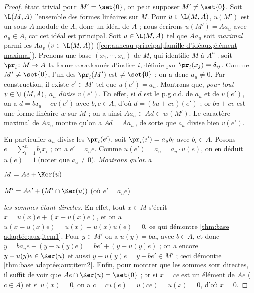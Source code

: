 \documentclass[11pt, %
  title in boldface,
  theorem in new line,
  theorem numbering = section,
  number theorems separately,
  simple name,
]{beaulivre}
\begin{document}
    \begin{proof}
         étant trivial pour \( M' = \set{0} \), on peut supposer \( M' \neq \set{0} \). Soit \( \L(M,A) \) l'ensemble des formes linéaires sur \( M \). Pour \( u \in \L(M,A) \), \( u(M') \) est un sous-\( A \)‑module de \( A \), donc un idéal de \( A \) ; nous écrirons \( u(M') = A a_u \) avec \( a_u \in A \), car cet idéal est principal. Soit \( u \in \L(M,A) \) tel que \( A a_u \) soit \emph{maximal} parmi les \( A a_v \) (\( v \in \L(M,A) \)) (\cref{cor:anneau principal;famille d'idéaux;élément maximal}). Prenons une base \( (x_1, \cdots, x_n) \) de \( M \), qui identifie \( M \) à \( A^n \) ; soit \( \pr_i \colon M \to A \) la forme coordonnée d'indice \( i \), définie par \( \pr_i(x_j) = \delta_{ij} \). Comme \( M' \neq \set{0} \), l'un des \( \pr_i(M') \) est \( \neq \set{0} \) ; on a donc \( a_u \neq 0 \). Par construction, il existe \( e' \in M' \) tel que \( u(e') = a_u \). Montrons que, \emph{pour tout \( v \in \L(M,A) \), \( a_u \) divise \( v(e') \)}. En effet, si \( d \) est le p.g.c.d. de \( a_u \) et de \( v(e') \), on a \( d = b a_u + c v(e') \) avec \( b,c \in A \), d'où \( d  = (bu+cv)(e') \) ; or \( bu + cv \) est une forme linéaire \( w \) sur \( M \) ; on a ainsi \( A a_u \subset Ad \subset w(M') \). Le caractère maximal de \( A a_u \) montre qu'on a \( Ad = A a_u \)\,, de sorte que \( a_u \) divise bien \( v(e') \).

        En particulier \( a_u \) divise les \( \pr_i(e') \), soit \( \pr_i(e') = a_u b_i \) avec \( b_i \in A \). Posons \( e = \sum_{i=1}^n b_i x_i \) ; on a \( e' = a_u e \). Comme \( u(e') = a_u = a_u \cdot u(e) \), on en déduit \( u(e) = 1 \) (noter que \( a_u \neq 0 \)). \emph{Montrons qu'on a}
        \begin{enumerate-roman}
            \item \label{thm:base adaptée;aux;item1} \( M = Ae + \Ker(u) \)
            \item \label{thm:base adaptée;aux;item2} \( M' = Ae' + (M' \cap \Ker(u)) \) \quad (où \( e' = a_u e \))
        \end{enumerate-roman}
        \emph{les sommes étant directes}. En effet, tout \( x \in M \) s'écrit \( x = u(x) e + (x-u(x)e) \), et on a \( u(x-u(x)e) = u(x) - u(x)u(e) = 0 \), ce qui démontre \ref{thm:base adaptée;aux;item1}. Pour \( y \in M' \) on a \( u(y) = b a_u \) avec \( b \in A \), et donc \( y = b a_u e + (y-u(y)e) = b e' + (y-u(y)e) \) ; on a encore \( y - u(y)e \in \Ker(u) \) et aussi \( y - u(y)e = y - b e' \in M' \) ; ceci démontre \ref{thm:base adaptée;aux;item2}. Enfin, pour montrer que les sommes sont directes, il suffit de voir que \( Ae \cap \Ker(u) = \set{0} \) ; or si \( x = ce \) est un élément de \( Ae \) (\( c \in A \)) et si \( u(x) = 0 \), on a \( c = c u(e) = u(ce) = u(x) = 0 \), d'où \( x = 0 \).


\end{proof}
\end{document}
